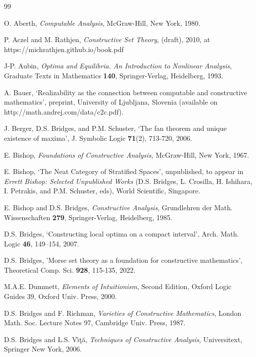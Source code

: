 \documentclass[11pt]{article}%
\begin{document}
\begin{thebibliography}{99}                                                                                               %


O. Aberth, \emph{Computable Analysis}, McGraw-Hill, New York, 1980.

P. Aczel and M. Rathjen, \emph{Constructive Set Theory},
(draft), 2010, at https://michrathjen.github.io/book.pdf

J-P. Aubin, \emph{Optima and Equilibria. An Introduction to
Nonlinear Analysis}, Graduate Texts in Mathematics \textbf{140},
Springer-Verlag, Heidelberg, 1993.

A. Bauer, `Realizability as the connection between computable
and constructive mathematics', preprint, University of Ljubljana, Slovenia
(available on http://math.andrej.com/data/c2c.pdf).

J. Berger, D.S. Bridges, and P.M. Schuster, `The fan theorem and
unique existence of maxima', J. Symbolic Logic \textbf{71}(2), 713-720, 2006.

E. Bishop, \emph{Foundations of Constructive Analysis},
McGraw-Hill, New York, 1967.

E. Bishop, `The Neat Category of Stratified Spaces',
unpublished, to appear in \emph{Errett Bishop: Selected Unpublished Works
}(D.S. Bridges, L. Crosilla, H. Ishihara, I. Petrakis, and P.M. Schuster,
eds), World Scientific, Singapore.

E. Bishop and D.S. Bridges, \emph{Constructive Analysis},
Grundlehren der Math. Wissenschaften \textbf{279}, Springer-Verlag,
Heidelberg, 1985.

D.S. Bridges, `Constructing local optima on a compact
interval', Arch. Math. Logic \textbf{46}, 149--154, 2007.

D.S. Bridges, 'Morse set theory as a foundation for
constructive mathematics', Theoretical Comp. Sci. \textbf{928}, 115-135, 2022.

M.A.E. Dummett, \emph{Elements of Intuitionism}, Second
Edition, Oxford Logic Guides 39, Oxford Univ. Press, 2000.

D.S. Bridges and F. Richman, \emph{Varieties of Constructive
Mathematics}, London Math. Soc. Lecture Notes 97, Cambridge Univ. Press, 1987.

D.S. Bridges and L.S. V\^{\i}\c{t}\u{a}, \emph{Techniques of
Constructive Analysis}, Universitext, Springer New York, 2006.


\end{thebibliography}
\end{document}
